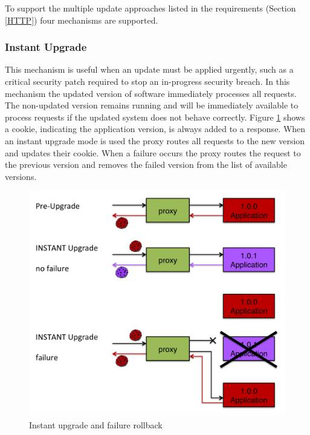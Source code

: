 \documentclass[a4paper,11pt,twoside]{report}
\begin{document}
To support the multiple update approaches listed in the requirements (Section \ref{HTTP}) four mechanisms are supported.

\subsubsection*{Instant Upgrade} 
This mechanism is useful when an update must be applied urgently, such as a critical security patch required to stop an in-progress security breach.  In this mechanism the updated version of software immediately processes all requests. The non-updated version remains running and will be immediately available to process requests if the updated system does not behave correctly. Figure \ref{instant_upgrade} shows a cookie, indicating the application version, is always added to a response.  When an instant upgrade mode is used the proxy routes all requests to the new version and updates their cookie.  When a failure occurs the proxy routes the request to the previous version and removes the failed version from the list of available versions.
   
\begin{figure}[!ht]
  \centering
     \includegraphics[scale=0.30]{instant_upgrade}
  \caption{Instant upgrade and failure rollback}
  \label{instant_upgrade}
\end{figure}
\end{document}
